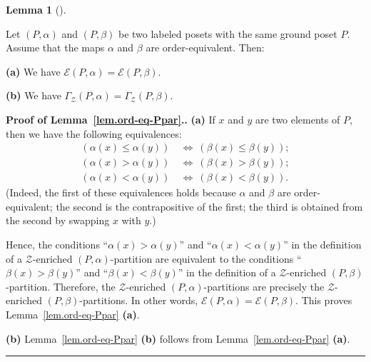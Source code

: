 \documentclass[numbers=enddot,12pt,final,onecolumn,notitlepage]{scrartcl}%
\theoremstyle{definition}
\newtheorem{lem}[theo]{Lemma}
\newenvironment{lemma}[1][]
{\begin{lem}[#1]\begin{leftbar}}
{\end{leftbar}\end{lem}}
\newenvironment{proof}[1][Proof]{\noindent\textbf{#1.} }{\ \rule{0.5em}{0.5em}}
\begin{document}
\begin{lemma} \label{lem.ord-eq-Ppar}
Let $\left(P, \alpha\right)$ and $\left(P, \beta\right)$ be two labeled posets
with the same ground poset $P$.
Assume that the maps $\alpha$ and $\beta$ are order-equivalent. Then:

\textbf{(a)} We have
$\mathcal{E}\left(P, \alpha\right) = \mathcal{E}\left(P, \beta\right)$.

\textbf{(b)} We have
$\Gamma_{\mathcal{Z}}\left(P, \alpha\right) = \Gamma_{\mathcal{Z}}\left(P, \beta\right)$.
\end{lemma}

\begin{proof}[Proof of Lemma~\ref{lem.ord-eq-Ppar}.]
\textbf{(a)} If $x$ and $y$ are two elements of $P$, then we have the following
equivalences:
\begin{align*}
\left( \alpha\left(x\right) \leq \alpha\left(y\right) \right)
  \ &\Longleftrightarrow \ %
  \left( \beta\left(x\right) \leq \beta\left(y\right) \right) ; \\
\left( \alpha\left(x\right) > \alpha\left(y\right) \right)
  \ &\Longleftrightarrow \ %
  \left( \beta\left(x\right) > \beta\left(y\right) \right) ; \\
\left( \alpha\left(x\right) < \alpha\left(y\right) \right)
  \ &\Longleftrightarrow \ %
  \left( \beta\left(x\right) < \beta\left(y\right) \right) .
\end{align*}
(Indeed, the first of these equivalences holds because $\alpha$ and $\beta$
are order-equivalent; the second is the contrapositive of the first; the
third is obtained from the second by swapping $x$ with $y$.)

Hence, the conditions ``$\alpha\left(x\right) > \alpha\left(y\right)$''
and ``$\alpha\left(x\right) < \alpha\left(y\right)$'' in the definition
of a $\mathcal{Z}$-enriched $\left(P, \alpha\right)$-partition are
equivalent to the conditions
``$\beta\left(x\right) > \beta\left(y\right)$''
and ``$\beta\left(x\right) < \beta\left(y\right)$'' in the definition
of a $\mathcal{Z}$-enriched $\left(P, \beta\right)$-partition.
Therefore, the $\mathcal{Z}$-enriched $\left(P, \alpha\right)$-partitions
are precisely the
$\mathcal{Z}$-enriched $\left(P, \beta\right)$-partitions.
In other words,
$\mathcal{E}\left(P, \alpha\right) = \mathcal{E}\left(P, \beta\right)$.
This proves Lemma~\ref{lem.ord-eq-Ppar} \textbf{(a)}.

\textbf{(b)} Lemma~\ref{lem.ord-eq-Ppar} \textbf{(b)} follows from
Lemma~\ref{lem.ord-eq-Ppar} \textbf{(a)}.
\end{proof}
\end{document}
